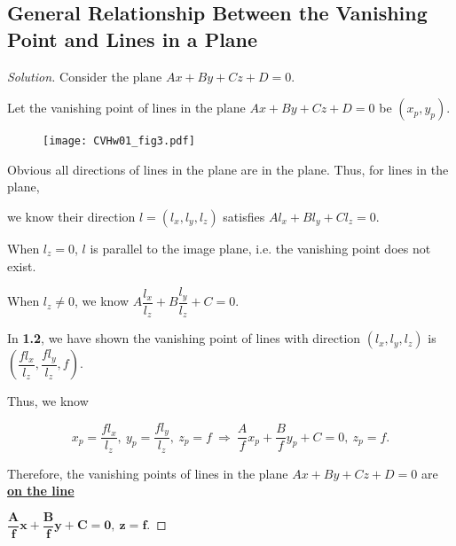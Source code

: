 \documentclass{article}
\newenvironment{solution}{\begin{proof}[\noindent\it Solution]}{\end{proof}}
\begin{document}
\subsection{General Relationship Between the Vanishing Point and Lines in a Plane}
\vspace{1em}
\begin{solution}
    Consider the plane $Ax+By+Cz+D=0$. 

    \hspace{2.6em}
    Let the vanishing point of lines in the plane $Ax+By+Cz+D=0$ be $(x_p,y_p)$.

    \vspace{-1em}
    \begin{figure}[htbp]
    	\centering
    	{\texttt{[image: CVHw01\_fig3.pdf]}}
    \end{figure}

    \vspace{-1em} \hspace{2.6em}
    Obvious all directions of lines in the plane are in the plane. Thus, for lines in the plane, 
    
    we know their direction $l=(l_x,l_y,l_z)$ satisfies $Al_x+Bl_y+Cl_z=0$.

    \hspace{2.6em}
    When $l_z=0$, $l$ is parallel to the image plane, i.e. the vanishing point does not exist.

    \vspace{0.2em} \hspace{2.6em}
    When $l_z\neq0$, we know $A\dfrac{l_x}{l_z}+B\dfrac{l_y}{l_z}+C=0.$

    \vspace{-0.3em} \hspace{2.6em}
    In \textbf{1.2}, we have shown the vanishing point of lines with direction $(l_x,l_y,l_z)$ is $\left(\dfrac{fl_x}{l_z},\dfrac{fl_y}{l_z}, f\right)$.

    \vspace{0.2em} \hspace{2.6em}
    Thus, we know

    \vspace{-1.2em}
    $$x_p=\dfrac{fl_x}{l_z}, \ y_p=\dfrac{fl_y}{l_z}, \ z_p=f\ \Longrightarrow \ \frac{A}{f}x_p+\frac{B}{f}y_p+C=0,\ z_p=f.$$
    
    \vspace{-0.3em} \hspace{2.6em}
    Therefore, the vanishing points of lines in the plane $Ax+By+Cz+D=0$ are \underline{\textbf{on the line}}
    
    \vspace{0.5em}
    \underline{$\boldsymbol{\dfrac{A}{f}x+\dfrac{B}{f}y+C=0,\ z=f}$}.
\end{solution}
\end{document}
